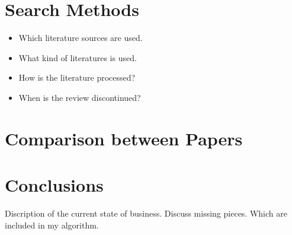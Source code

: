 {}

\section*{Search Methods}

\begin{itemize}
\item Which literature sources are used.
\item What kind of literatures is used.
\item How is the literature processed?
\item When is the review discontinued?
\end{itemize}


\section*{Comparison between Papers}


\section*{Conclusions}

Discription of the current state of business. Discuss missing pieces. Which are included in my algorithm.



